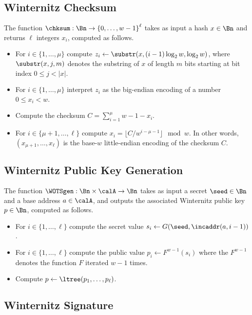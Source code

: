 \subsection{Winternitz Checksum}

The function $\chksum : \Bn \to {\{0, \ldots, w-1\}}^\ell$ takes as input a hash $x \in \Bn$ and returns $\ell$ integers $x_i$, computed as follows.

\begin{itemize}
\item For $i \in \{1, \ldots, \mu\}$ compute $z_i \gets \substr(x, (i-1)\log_2{w}, \log_2{w})$, where $\substr(x, j, m)$ denotes the substring of $x$ of length $m$ bits starting at bit index $0 \le j < |x|$.
\item For $i \in \{1, \ldots, \mu\}$ interpret $z_i$ as the big-endian encoding of a number $0 \le x_i < w$.
\item Compute the checksum $C = \sum_{i=1}^\mu w-1-x_i$.
\item For $i \in \{\mu+1, \ldots, \ell\}$ compute $x_i = \lfloor C / w^{i-\mu-1} \rfloor \mod w$.
In other words, $(x_{\mu+1}, \ldots, x_\ell)$ is the base-$w$ little-endian encoding of the checksum $C$.
\end{itemize}

\subsection{Winternitz Public Key Generation}

The function $\WOTSgen : \Bn \times \calA \to \Bn$ takes as input a secret $\seed \in \Bn$ and a base address $a \in \calA$, and outputs the associated Winternitz public key $p \in \Bn$, computed as follows.

\begin{itemize}
\item For $i \in \{1, \ldots, \ell\}$ compute the secret value $s_i \gets G(\seed, \incaddr(a, i-1))$.
\item For $i \in \{1, \ldots, \ell\}$ compute the public value $p_i \gets F^{w-1}(s_i)$ where the $F^{w-1}$ denotes the function $F$ iterated $w-1$ times.
\item Compute $p \gets \ltree(p_1, \ldots, p_\ell)$.
\end{itemize}

\subsection{Winternitz Signature}

